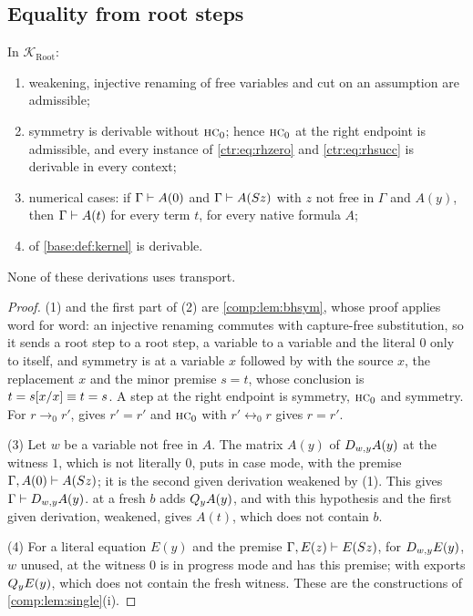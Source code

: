 \subsection{Equality from root steps}

\begin{lemma}\label{ctr:lem:rootstruct}
In $\mathcal K_{\mathrm{Root}}$:
\begin{enumerate}
\item weakening, injective renaming of free variables and cut on an assumption are
admissible;
\item symmetry is derivable without $\rulename{HC}_0$; hence $\rulename{HC}_0$ at the right
endpoint is admissible, and every instance of \eqref{ctr:eq:rhzero} and
\eqref{ctr:eq:rhsucc} is derivable in every context;
\item numerical cases: if $\Gamma\vdash A(0)$ and $\Gamma\vdash A(S z)$ with $z$ not
free in $\Gamma$ and $A(y)$, then $\Gamma\vdash A(t)$ for every term $t$, for every native
formula $A$;
\item {} of \cref{base:def:kernel} is derivable.
\end{enumerate}
None of these derivations uses transport.
\end{lemma}
\begin{proof}
(1) and the first part of (2) are \cref{comp:lem:bhsym}, whose proof applies word for word:
an injective renaming commutes with capture-free substitution, so it sends a root step to a
root step, a variable to a variable and the literal $0$ only to itself, and symmetry is
 at a variable $x$ followed by  with the source $x$, the
replacement $x$ and the minor premise $s=t$, whose conclusion is $t=s[x/x]\equiv t=s$.
A step at the right endpoint is symmetry, $\rulename{HC}_0$ and symmetry. For $r\to_0 r'$,
 gives $r'=r'$ and $\rulename{HC}_0$ with $r'\leftrightarrow_0 r$ gives
$r=r'$.

(3) Let $w$ be a variable not free in $A$. The matrix $A(y)$ of $D_{w,y}A(y)$ at the witness
$1$, which is not literally $0$, puts  in case mode, with the premise
$\Gamma,A(0)\vdash A(S z)$; it is the second given derivation weakened by (1). This gives
$\Gamma\vdash D_{w,y}A(y)$.  at a fresh $b$ adds $Q_{y}A(y)$, and 
with this hypothesis and the first given derivation, weakened, gives $A(t)$, which does not
contain $b$.

(4) For a literal equation $E(y)$ and the premise $\Gamma,E(z)\vdash E(S z)$,
 for $D_{w,y}E(y)$, $w$ unused, at the witness $0$ is in progress mode and has
this premise;  with  exports $Q_{y}E(y)$, which does not contain
the fresh witness. These are the constructions of \cref{comp:lem:single}(i).
\end{proof}

